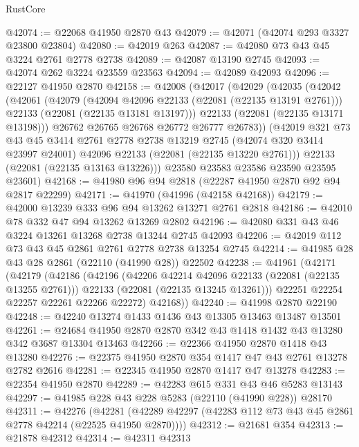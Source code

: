 \begin{lexlean}{RustCore}
\begin{coremodule}
@42074 := @22068 @41950 @2870 @43
@42079 := @42071 (@42074 @293 @3327 @23800 @23804)
@42080 := @42019 @263
@42087 := @42080 @73 @43 @45 @3224 @2761 @2778 @2738
@42089 := @42087 @13190 @2745
@42093 := @42074 @262 @3224 @23559 @23563
@42094 := @42089 @42093
@42096 := @22127 @41950 @2870
@42158 := @42008
    (@42017
      (@42029
        (@42035
          (@42042
            (@42061
              (@42079
                (@42094 @42096 @22133 (@22081 (@22135 @13191 @2761)))
                @22133
                (@22081 (@22135 @13181 @13197)))
              @22133
              (@22081 (@22135 @13171 @13198)))
            @26762
            @26765
            @26768
            @26772
            @26777
            @26783))
        (@42019
          @321
          @73
          @43
          @45
          @3414
          @2761
          @2778
          @2738
          @13219
          @2745
          (@42074 @320 @3414 @23997 @24001)
          @42096
          @22133
          (@22081 (@22135 @13220 @2761)))
        @22133
        (@22081 (@22135 @13163 @13226)))
      @23580
      @23583
      @23586
      @23590
      @23595
      @23601)
@42168 := @41980 @96 @94 @2818 (@22287 @41950 @2870 @92 @94 @2817 @22299)
@42171 := @41970 (@41996 (@42158 @42168))
@42179 := @42000 @13239 @333 @96 @94 @13262 @13271 @2761 @2818
@42186 := @42010 @78 @332 @47 @94 @13262 @13269 @2802
@42196 := @42080 @331 @43 @46 @3224 @13261 @13268 @2738 @13244 @2745 @42093
@42206 := @42019 @112 @73 @43 @45 @2861 @2761 @2778 @2738 @13254 @2745
@42214 := @41985 @28 @43 @28 @2861 (@22110 (@41990 @28)) @22502
@42238 := @41961
    (@42171
      (@42179
        (@42186
          (@42196
            (@42206 @42214 @42096 @22133 (@22081 (@22135 @13255 @2761)))
            @22133
            (@22081 (@22135 @13245 @13261)))
          @22251
          @22254
          @22257
          @22261
          @22266
          @22272)
        @42168))
@42240 := @41998 @2870 @22190
@42248 := @42240 @13274 @1433 @1436 @43 @13305 @13463 @13487 @13501
@42261 := @24684 @41950 @2870 @2870 @342 @43 @1418 @1432 @43 @13280 @342 @3687 @13304 @13463
@42266 := @22366 @41950 @2870 @1418 @43 @13280
@42276 := @22375 @41950 @2870 @354 @1417 @47 @43 @2761 @13278 @2782 @2616
@42281 := @22345 @41950 @2870 @1417 @47 @13278
@42283 := @22354 @41950 @2870
@42289 := @42283 @615 @331 @43 @46 @5283 @13143
@42297 := @41985 @228 @43 @228 @5283 (@22110 (@41990 @228)) @28170
@42311 := @42276
    (@42281 (@42289 @42297 (@42283 @112 @73 @43 @45 @2861 @2778 @42214 (@22525 @41950 @2870))))
@42312 := @21681 @354
@42313 := @21878 @42312
@42314 := @42311 @42313

\end{coremodule}
\end{lexlean}
